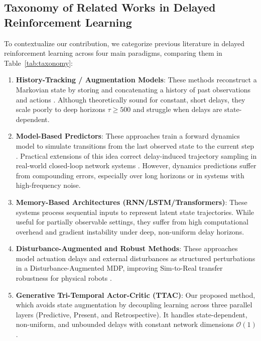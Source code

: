 \documentclass[manuscript, screen, review]{jair}
\begin{document}
\subsection{Taxonomy of Related Works in Delayed Reinforcement Learning}
To contextualize our contribution, we categorize previous literature in delayed reinforcement learning across four main paradigms, comparing them in Table~\ref{tab:taxonomy}:
\begin{enumerate}
    \item \textbf{History-Tracking / Augmentation Models}: These methods reconstruct a Markovian state by storing and concatenating a history of past observations and actions \citep{katsikopoulos2003markov, walsh2010choosing}. Although theoretically sound for constant, short delays, they scale poorly to deep horizons $\tau \ge 500$ and struggle when delays are state-dependent.
    \item \textbf{Model-Based Predictors}: These approaches train a forward dynamics model to simulate transitions from the last observed state to the current step \citep{schuitema2010control, bouteiller2020reinforcement}. Practical extensions of this idea correct delay-induced trajectory sampling in real-world closed-loop network systems \citep{du2022random}. However, dynamics predictions suffer from compounding errors, especially over long horizons or in systems with high-frequency noise.
    \item \textbf{Memory-Based Architectures (RNN/LSTM/Transformers)}: These systems process sequential inputs to represent latent state trajectories. While useful for partially observable settings, they suffer from high computational overhead and gradient instability under deep, non-uniform delay horizons.
    \item \textbf{Disturbance-Augmented and Robust Methods}: These approaches model actuation delays and external disturbances as structured perturbations in a Disturbance-Augmented MDP, improving Sim-to-Real transfer robustness for physical robots \citep{malmir2025diarl}.
    \item \textbf{Generative Tri-Temporal Actor-Critic (TTAC)}: Our proposed method, which avoids state augmentation by decoupling learning across three parallel layers (Predictive, Present, and Retrospective). It handles state-dependent, non-uniform, and unbounded delays with constant network dimensions $\mathcal{O}(1)$.
\end{enumerate}
\end{document}
